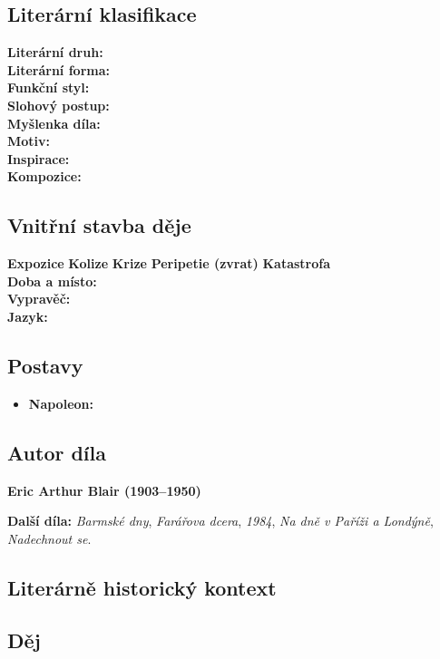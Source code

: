 \documentclass[12pt, a4paper]{article}
\newcommand{\mybf}[1]{\textcolor[RGB]{0, 179, 219}{\textbf{#1}}}
\begin{document}
\subsection*{Literární klasifikace}
\mybf{Literární druh:} \\[3pt]
\mybf{Literární forma:} \\[3pt]
\mybf{Funkční styl:} \\[3pt]
\mybf{Slohový postup:} \\[10pt]
\mybf{Myšlenka díla:} \\[10pt]
\mybf{Motiv:} \\[10pt]
\mybf{Inspirace:} \\[10pt]
\mybf{Kompozice:} 

\subsection*{Vnitřní stavba děje}
\noindent\textbf{Expozice} 
\noindent\textbf{Kolize} 
\noindent\textbf{Krize} 
\noindent\textbf{Peripetie (zvrat)} 
\noindent\textbf{Katastrofa} \\[10pt]
\mybf{Doba a místo:} \\[10pt]
\mybf{Vypravěč:} \\[10pt]
\mybf{Jazyk:} 

\subsection*{Postavy}
\begin{itemize}[itemsep=0.3em]
	\item \textbf{Napoleon:}
\end{itemize}

\subsection*{Autor díla}
\textbf{Eric Arthur Blair (1903--1950)}

\textbf{Další díla:} \textit{Barmské dny}, \textit{Farářova dcera}, \textit{1984}, \textit{Na dně v Paříži a Londýně}, \textit{Nadechnout se}.

\subsection*{Literárně historický kontext}

{\color{subsectioncolor}\hrulefill}
\subsection*{\color{subsectioncolor}Děj}
\end{document}
